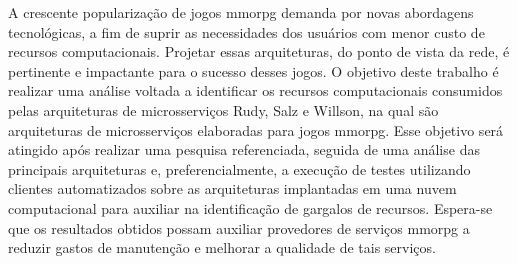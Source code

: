 A crescente popularização de jogos \acf{mmorpg} demanda por novas abordagens tecnológicas, a fim de suprir as necessidades dos usuários com menor custo de recursos computacionais.
%
Projetar essas arquiteturas, do ponto de vista da rede, é pertinente e impactante para o sucesso desses jogos.
%
O objetivo deste trabalho é realizar uma análise voltada a identificar os recursos computacionais consumidos pelas arquiteturas de microsserviços Rudy, Salz e Willson, na qual são arquiteturas de microsserviços elaboradas para jogos \ac{mmorpg}.
%
Esse objetivo será atingido após realizar uma pesquisa referenciada, seguida de uma análise das principais arquiteturas e, preferencialmente, a execução de testes utilizando clientes automatizados sobre as arquiteturas implantadas em uma nuvem computacional para auxiliar na identificação de gargalos de recursos. 
%
Espera-se que os resultados obtidos possam auxiliar provedores de serviços \ac{mmorpg} a reduzir gastos de manutenção e melhorar a qualidade de tais serviços. \\
